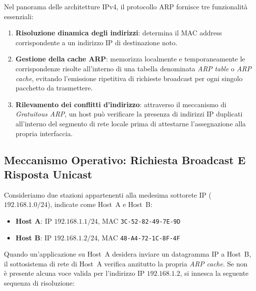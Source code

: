 \documentclass[11pt, a4paper]{article}
\begin{document}
Nel panorama delle architetture IPv4, il protocollo ARP fornisce tre funzionalità essenziali:
\begin{enumerate}[noitemsep]
    \item \textbf{Risoluzione dinamica degli indirizzi}: determina il MAC address corrispondente a un indirizzo IP di destinazione noto.
    \item \textbf{Gestione della cache ARP}: memorizza localmente e temporaneamente le corrispondenze risolte all'interno di una tabella denominata \emph{ARP table} o \emph{ARP cache}, evitando l'emissione ripetitiva di richieste broadcast per ogni singolo pacchetto da trasmettere.
    \item \textbf{Rilevamento dei conflitti d'indirizzo}: attraverso il meccanismo di \emph{Gratuitous ARP}, un host può verificare la presenza di indirizzi IP duplicati all'interno del segmento di rete locale prima di attestarne l'assegnazione alla propria interfaccia.
\end{enumerate}

\subsection{Meccanismo Operativo: Richiesta Broadcast E Risposta Unicast}

Consideriamo due stazioni appartenenti alla medesima sottorete IP ($192.168.1.0/24$), indicate come Host~A e Host~B:
\begin{itemize}[noitemsep]
    \item \textbf{Host A}: IP $192.168.1.1/24$, MAC \texttt{3C-52-82-49-7E-9D}
    \item \textbf{Host B}: IP $192.168.1.2/24$, MAC \texttt{48-A4-72-1C-8F-4F}
\end{itemize}

Quando un'applicazione su Host~A desidera inviare un datagramma IP a Host~B, il sottosistema di rete di Host~A verifica anzitutto la propria \emph{ARP cache}. Se non è presente alcuna voce valida per l'indirizzo IP $192.168.1.2$, si innesca la seguente sequenza di risoluzione:

\end{document}
